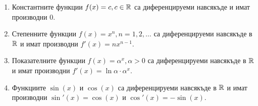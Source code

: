 \documentclass[numbers=endperiod, DIV=15, bibliography=totocnumbered]{scrartcl}
\begin{document}
\begin{theorem}
  \mbox{}
  \begin{enumerate}
    \item Константните функции $f(x) = c, c \in \mathbb{R}$ са диференцируеми навсякъде и имат производни $0$.
    \item Степенните функции $f(x) = x^n, n = 1, 2, \ldots$ са диференцируеми навсякъде в $\mathbb{R}$ и имат производни $f'(x) = n x^{n-1}$.
    \item Показателните функции $f(x) = \alpha^x, \alpha > 0$ са диференцируеми навсякъде в $\mathbb{R}$ и имат производни $f'(x) = \ln \alpha \cdot \alpha^x$.
    \item Функциите $\sin(x)$ и $\cos(x)$ са диференцируеми навсякъде в $\mathbb{R}$ и имат производни $\sin'(x) = \cos(x)$ и $\cos'(x) = -\sin(x)$.
  \end{enumerate}
\end{theorem}
\end{document}
